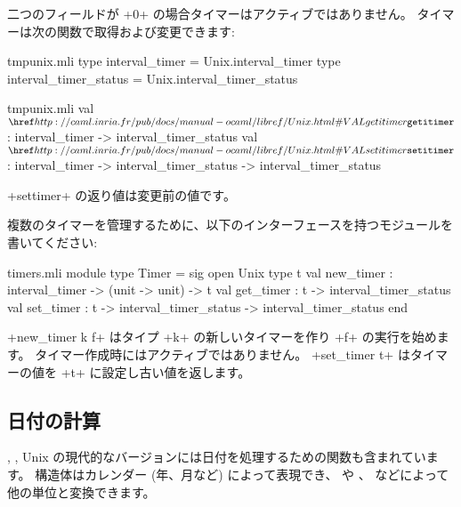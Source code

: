 %
二つのフィールドが \ml+0+ の場合タイマーはアクティブではありません。
タイマーは次の関数で取得および変更できます:
%
\begin{codefile}{tmpunix.mli}
type interval_timer = Unix.interval_timer
type interval_timer_status = Unix.interval_timer_status
\end{codefile}
%
\begin{listingcodefile}{tmpunix.mli}
val $\indexlibvalue{Unix}{getitimer}$ : interval_timer -> interval_timer_status
val $\indexlibvalue{Unix}{setitimer}$ :
    interval_timer -> interval_timer_status -> interval_timer_status
\end{listingcodefile}
%
\ml+settimer+ の返り値は変更前の値です。

\begin{exercise}[noanswer]
複数のタイマーを管理するために、以下のインターフェースを持つモジュールを書いてください:
%
\begin{listingcodefile}{timers.mli}
module type Timer = sig
  open Unix
  type t
  val new_timer : interval_timer -> (unit -> unit) -> t
  val get_timer : t -> interval_timer_status
  val set_timer : t -> interval_timer_status -> interval_timer_status
end
\end{listingcodefile}
%
\ml+new_timer k f+ はタイプ \ml+k+ の新しいタイマーを作り \ml+f+ の実行を始めます。
タイマー作成時にはアクティブではありません。
\ml+set_timer t+ はタイマーの値を \ml+t+ に設定し古い値を返します。

\end{exercise}

\subsection*{日付の計算}

, , \etc
Unix の現代的なバージョンには日付を処理するための関数も含まれています。
 構造体はカレンダー (年、月など) によって表現でき、
 や
、  などによって他の単位と変換できます。

